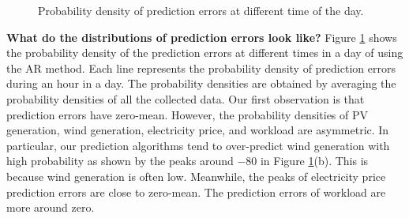 \begin{figure}[pbth]
	\centering
	\vspace{-0.3cm}
	\vspace{-0.2cm}
	\caption{Probability density of prediction errors at different time of the day.}	
	\label{fig:hourlyDistribution}
	\vspace{-0.4cm}
\end{figure}

\textbf{What do the distributions of prediction errors look like?} Figure \ref{fig:hourlyDistribution} shows the probability density of the prediction errors at different times in a day of using the AR method. Each line represents the probability density of prediction errors during an hour in a day. The probability densities are obtained by averaging the probability densities of all the collected data. Our first observation is that prediction errors have zero-mean. However, the probability densities of PV generation, wind generation, electricity price, and workload are asymmetric. In particular, our prediction algorithms tend to over-predict wind generation with high probability as shown by the peaks around $-80$ in Figure \ref{fig:hourlyDistribution}(b). This is because wind generation is often low. Meanwhile, the peaks of electricity price prediction errors are close to zero-mean. The prediction errors of workload are more around zero. 


